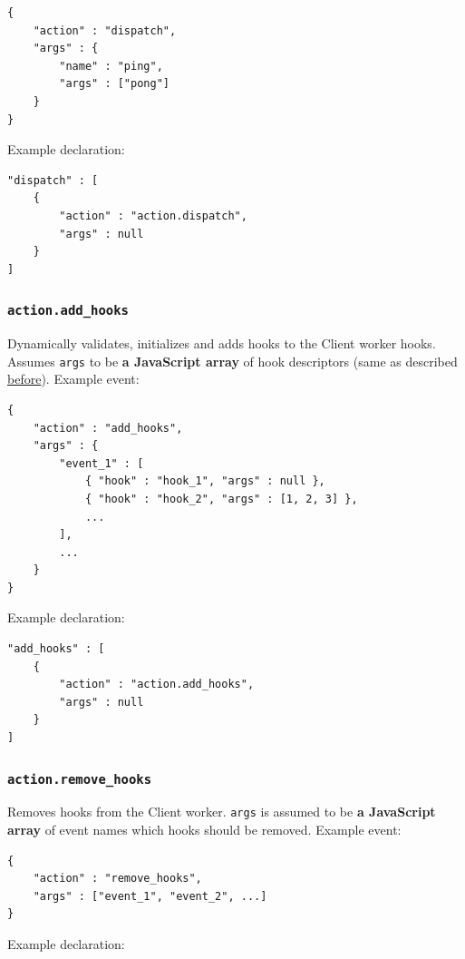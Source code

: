 \documentclass[a4paper]{article}
\begin{document}
\begin{verbatim}
{
    "action" : "dispatch",
    "args" : {
        "name" : "ping",
        "args" : ["pong"]
    }
}
\end{verbatim}




\noindent
Example declaration:

\begin{verbatim}
"dispatch" : [
    {
        "action" : "action.dispatch",
        "args" : null
    }
]
\end{verbatim}
\subsubsection{\texttt{action.add\_hooks}}
\label{sec-9-3-6}

Dynamically validates, initializes and adds hooks to the Client worker hooks. Assumes \texttt{args} to be \textbf{a JavaScript array} of hook descriptors (same as described \hyperref[ref-hooks_config]{before}). Example event:

\begin{verbatim}
{
    "action" : "add_hooks",
    "args" : {
        "event_1" : [
            { "hook" : "hook_1", "args" : null },
            { "hook" : "hook_2", "args" : [1, 2, 3] },
            ...
        ],
        ...
    }
}
\end{verbatim}




\noindent
Example declaration:

\begin{verbatim}
"add_hooks" : [
    {
        "action" : "action.add_hooks",
        "args" : null
    }
]
\end{verbatim}
\subsubsection{\texttt{action.remove\_hooks}}
\label{sec-9-3-7}

Removes hooks from the Client worker. \texttt{args} is assumed to be \textbf{a JavaScript array} of event names which hooks should be removed. Example event:

\begin{verbatim}
{
    "action" : "remove_hooks",
    "args" : ["event_1", "event_2", ...]
}
\end{verbatim}




\noindent
Example declaration:
\end{document}
